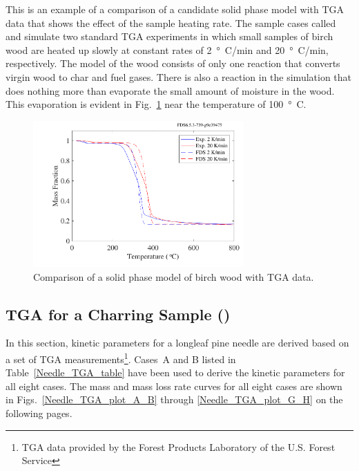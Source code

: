 \documentclass[11pt]{book}
\begin{document}
This is an example of a comparison of a candidate solid phase model with TGA data that shows the effect of the sample heating rate. The sample cases called  and  simulate two standard TGA experiments in which small samples of birch wood are heated up slowly at constant rates of 2~\si{\degree C}/min and 20~\si{\degree C}/min, respectively. The model of the wood consists of only one reaction that converts virgin wood to char and fuel gases. There is also a reaction in the simulation that does nothing more than evaporate the small amount of moisture in the wood. This evaporation is evident in Fig.~\ref{fig_birch_tga} near the temperature of 100~\si{\degree C}.
\begin{figure}[!htb]
\centering
\includegraphics[height=2.2in]{SCRIPT_FIGURES/birch_tga}
\caption[An example of TGA data]{\label{fig_birch_tga} Comparison of a solid phase model of birch wood with TGA data.}
\end{figure}


\subsection{TGA for a Charring Sample (\texorpdfstring{}{Needle\_TGA})}
\label{Needle_TGA}

In this section, kinetic parameters for a longleaf pine needle are derived based on a set of TGA measurements\footnote{TGA data provided by the Forest Products Laboratory of the U.S. Forest Service}. Cases~A and B listed in Table~\ref{Needle_TGA_table} have been used to derive the kinetic parameters for all eight cases. The mass and mass loss rate curves for all eight cases are shown in Figs.~\ref{Needle_TGA_plot_A_B} through \ref{Needle_TGA_plot_G_H} on the following pages.
\end{document}
